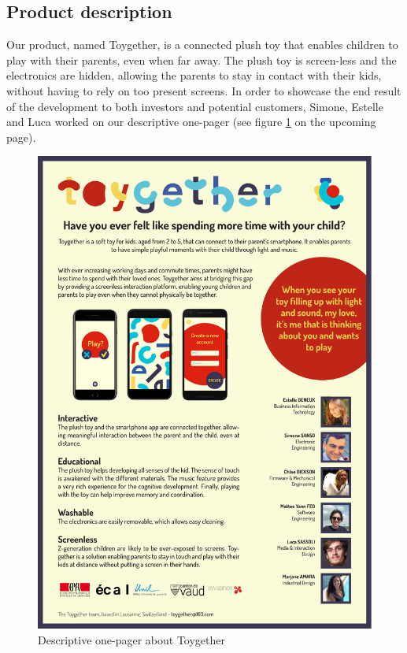 \subsection{Product description}
\label{sec:product_Description}

Our product, named Toygether, is a connected plush toy that enables children to play with their parents, even when far away. The plush toy is screen-less and the electronics are hidden, allowing the parents to stay in contact with their kids, without having to rely on too present screens. In order to showcase the end result of the development to both investors and potential customers, Simone, Estelle and Luca worked on our descriptive one-pager (see figure \ref{fig:one_pager} on the upcoming page).

\begin{figure}[hbtp]
    \centering
    \includegraphics[scale=0.78]{images/intro_one_pager.pdf}
    \caption{Descriptive one-pager about Toygether}
    \label{fig:one_pager}
\end{figure}


